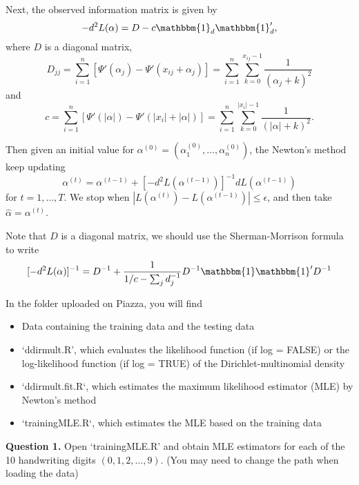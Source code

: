 \documentclass[twoside, letter]{article}
\begin{document}
Next, the observed information matrix is given by
$$
- d^2 L(\alpha) = D - c\mathbbm{1}_d \mathbbm{1}_d',
$$
where $D$ is a diagonal matrix,
$$
D_{jj} = \sum_{i=1}^n \left[\Psi'(\alpha_j) - \Psi'(x_{ij} + \alpha_j) \right]
=
\sum_{i=1}^n \sum_{k=0}^{x_{ij} - 1} \frac{1}{(\alpha_j + k)^2}
$$
and 
$$
c = \sum_{i=1}^n 
\left[
\Psi'(|\alpha|)  - \Psi'(|x_i| + |\alpha|) 
\right]
= \sum_{i=1}^n \sum_{k=0}^{|x_i| - 1} \frac{1}{(|\alpha| + k)^2}.
$$

Then given an initial value for $\alpha^{(0)}  = (\alpha_1^{(0)}, \dots, \alpha_n^{(0)})$, the Newton's method keep updating 
$$
\alpha^{(t)} = \alpha^{(t-1)} + [-d^2 L(\alpha^{(t-1)})]^{-1} d L(\alpha^{(t-1)})
$$
for $t = 1, \dots, T$. We stop when $|L(\alpha^{(t)}) - L(\alpha^{(t-1)})| \leq \epsilon$, and then take $\hat\alpha = \alpha^{(t)}$.

Note that $D$ is a diagonal matrix, we should use the Sherman-Morrison formula to write 
$$
[- d^2 L(\alpha)]^{-1} = D^{-1} + \frac{1}{1/c - \sum_j d_j^{-1}} D^{-1} \mathbbm{1} \mathbbm{1}' D^{-1}
$$


In the folder uploaded on Piazza, you will find 
\begin{itemize}
\item Data containing the training data and the testing data
\item `ddirmult.R', which evaluates the likelihood function (if log = FALSE) or the log-likelihood function (if log = TRUE) of the Dirichlet-multinomial density
\item `ddirmult.fit.R`, which estimates the maximum likelihood estimator (MLE) by Newton's method
\item `trainingMLE.R`, which estimates the MLE based on the training data
\end{itemize}

{\bf Question 1.} Open `trainingMLE.R' and obtain MLE estimators for each of the 10 handwriting digits $(0,1,2,\dots,9)$. (You may need to change the path when loading the data)
\end{document}

